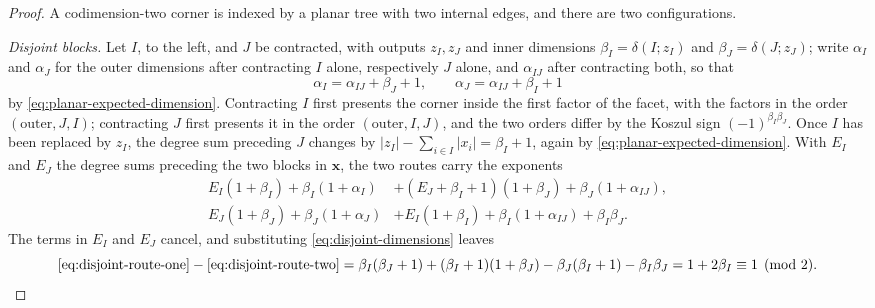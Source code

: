 \documentclass[11pt,letterpaper,twoside]{article}
\theoremstyle{plain}
\theoremstyle{definition}
\theoremstyle{remark}
\begin{document}
\begin{proof}
A codimension-two corner is indexed by a planar tree with two internal edges, and there are two configurations.

\emph{Disjoint blocks.}  Let \(I\), to the left, and \(J\) be contracted, with outputs \(z_I,z_J\) and inner dimensions \(\beta_I=\delta(I;z_I)\) and \(\beta_J=\delta(J;z_J)\); write \(\alpha_I\) and \(\alpha_J\) for the outer dimensions after contracting \(I\) alone, respectively \(J\) alone, and \(\alpha_{IJ}\) after contracting both, so that
\begin{equation}\label{eq:disjoint-dimensions}
 \alpha_I=\alpha_{IJ}+\beta_J+1,
 \qquad
 \alpha_J=\alpha_{IJ}+\beta_I+1
\end{equation}
by \eqref{eq:planar-expected-dimension}.  Contracting \(I\) first presents the corner inside the first factor of the facet, with the factors in the order \((\text{outer},J,I)\); contracting \(J\) first presents it in the order \((\text{outer},I,J)\), and the two orders differ by the Koszul sign \((-1)^{\beta_I\beta_J}\).  Once \(I\) has been replaced by \(z_I\), the degree sum preceding \(J\) changes by \(|z_I|-\sum_{i\in I}|x_i|=\beta_I+1\), again by \eqref{eq:planar-expected-dimension}.  With \(E_I\) and \(E_J\) the degree sums preceding the two blocks in \(\mathbf x\), the two routes carry the exponents
\begin{align}
 \label{eq:disjoint-route-one}
 E_I(1+\beta_I)+\beta_I(1+\alpha_I)
 &+(E_J+\beta_I+1)(1+\beta_J)+\beta_J(1+\alpha_{IJ}),\\
 \label{eq:disjoint-route-two}
 E_J(1+\beta_J)+\beta_J(1+\alpha_J)
 &+E_I(1+\beta_I)+\beta_I(1+\alpha_{IJ})+\beta_I\beta_J.
\end{align}
The terms in \(E_I\) and \(E_J\) cancel, and substituting \eqref{eq:disjoint-dimensions} leaves
\begin{equation}\label{eq:disjoint-difference}
 \eqref{eq:disjoint-route-one}-\eqref{eq:disjoint-route-two}
 =\beta_I(\beta_J+1)+(\beta_I+1)(1+\beta_J)
 -\beta_J(\beta_I+1)-\beta_I\beta_J
 =1+2\beta_I
 \equiv1\pmod2.
\end{equation}


\end{proof}
\end{document}
